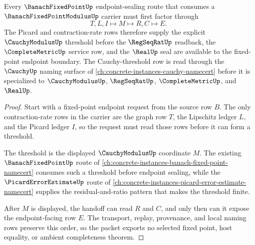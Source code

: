 \begin{theorem}
\label{thm:banach-fixed-point-modulus-picard-handoff}
Every $\BanachFixedPointUp$ endpoint-sealing route that consumes a $\BanachFixedPointModulusUp$ carrier must first factor through
$$
T,L,I\longmapsto M\longmapsto R,C\longmapsto E .
$$
The Picard and contraction-rate rows therefore supply the explicit $\CauchyModulusUp$ threshold before the $\RegSeqRatUp$ readback, the $\CompleteMetricUp$ service row, and the $\RealUp$ seal are available to the fixed-point endpoint boundary. The Cauchy-threshold row is read through the $\CauchyUp$ naming surface of \autoref{ch:concrete-instances-cauchy-namecert} before it is specialized to $\CauchyModulusUp$, $\RegSeqRatUp$, $\CompleteMetricUp$, and $\RealUp$.
\end{theorem}
\begin{proof}
Start with a fixed-point endpoint request from the source row $B$. The only contraction-rate rows in the carrier are the graph row $T$, the Lipschitz ledger $L$, and the Picard ledger $I$, so the request must read those rows before it can form a threshold.

The threshold is the displayed $\CauchyModulusUp$ coordinate $M$. The existing $\BanachFixedPointUp$ route of \autoref{ch:concrete-instances-banach-fixed-point-namecert} consumes such a threshold before endpoint sealing, while the $\PicardErrorEstimateUp$ route of \autoref{ch:concrete-instances-picard-error-estimate-namecert} supplies the residual-and-ratio pattern that makes the threshold finite.

After $M$ is displayed, the handoff can read $R$ and $C$, and only then can it expose the endpoint-facing row $E$. The transport, replay, provenance, and local naming rows preserve this order, so the packet exports no selected fixed point, host equality, or ambient completeness theorem.
\end{proof}


